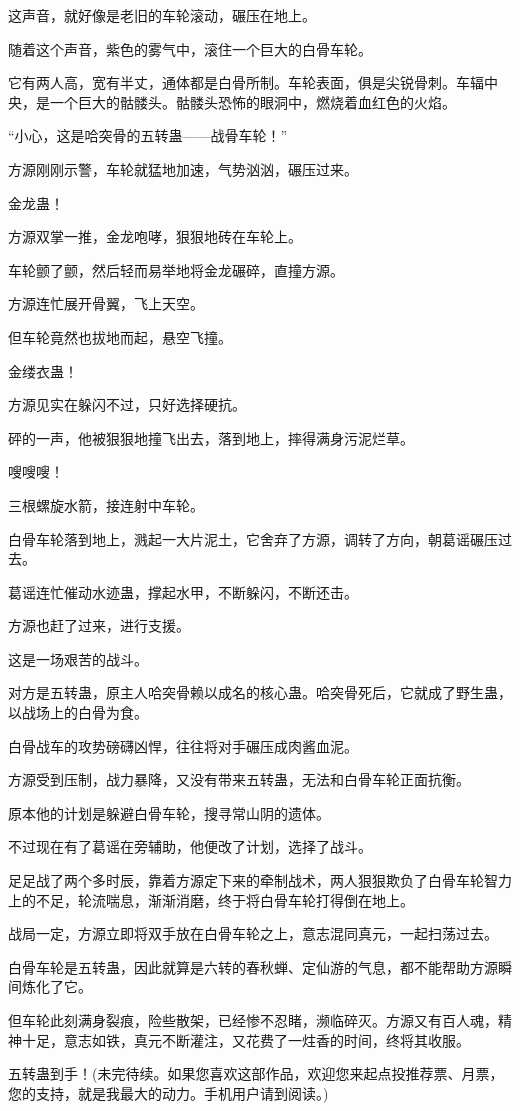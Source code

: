 \begin{this_body}
这声音，就好像是老旧的车轮滚动，碾压在地上。

随着这个声音，紫色的雾气中，滚住一个巨大的白骨车轮。

它有两人高，宽有半丈，通体都是白骨所制。车轮表面，俱是尖锐骨刺。车辐中央，是一个巨大的骷髅头。骷髅头恐怖的眼洞中，燃烧着血红色的火焰。

“小心，这是哈突骨的五转蛊——战骨车轮！”

方源刚刚示警，车轮就猛地加速，气势汹汹，碾压过来。

金龙蛊！

方源双掌一推，金龙咆哮，狠狠地砖在车轮上。

车轮颤了颤，然后轻而易举地将金龙碾碎，直撞方源。

方源连忙展开骨翼，飞上天空。

但车轮竟然也拔地而起，悬空飞撞。

金缕衣蛊！

方源见实在躲闪不过，只好选择硬抗。

砰的一声，他被狠狠地撞飞出去，落到地上，摔得满身污泥烂草。

嗖嗖嗖！

三根螺旋水箭，接连射中车轮。

白骨车轮落到地上，溅起一大片泥土，它舍弃了方源，调转了方向，朝葛谣碾压过去。

葛谣连忙催动水迹蛊，撑起水甲，不断躲闪，不断还击。

方源也赶了过来，进行支援。

这是一场艰苦的战斗。

对方是五转蛊，原主人哈突骨赖以成名的核心蛊。哈突骨死后，它就成了野生蛊，以战场上的白骨为食。

白骨战车的攻势磅礴凶悍，往往将对手碾压成肉酱血泥。

方源受到压制，战力暴降，又没有带来五转蛊，无法和白骨车轮正面抗衡。

原本他的计划是躲避白骨车轮，搜寻常山阴的遗体。

不过现在有了葛谣在旁辅助，他便改了计划，选择了战斗。

足足战了两个多时辰，靠着方源定下来的牵制战术，两人狠狠欺负了白骨车轮智力上的不足，轮流喘息，渐渐消磨，终于将白骨车轮打得倒在地上。

战局一定，方源立即将双手放在白骨车轮之上，意志混同真元，一起扫荡过去。

白骨车轮是五转蛊，因此就算是六转的春秋蝉、定仙游的气息，都不能帮助方源瞬间炼化了它。

但车轮此刻满身裂痕，险些散架，已经惨不忍睹，濒临碎灭。方源又有百人魂，精神十足，意志如铁，真元不断灌注，又花费了一炷香的时间，终将其收服。

五转蛊到手！(未完待续。如果您喜欢这部作品，欢迎您来起点投推荐票、月票，您的支持，就是我最大的动力。手机用户请到阅读。)

\end{this_body}

